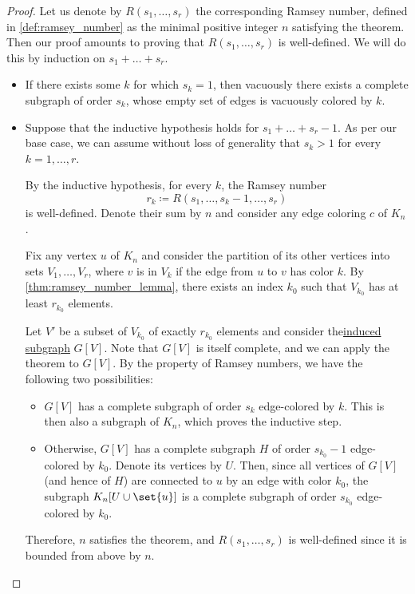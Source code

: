 \begin{proof}
  Let us denote by \( R(s_1, \ldots, s_r) \) the corresponding Ramsey number, defined in \cref{def:ramsey_number} as the minimal positive integer \( n \) satisfying the theorem. Then our proof amounts to proving that \( R(s_1, \ldots, s_r) \) is well-defined. We will do this by induction on \( s_1 + \ldots + s_r \).

  \begin{itemize}
    \item If there exists some \( k \) for which \( s_k = 1 \), then vacuously there exists a complete subgraph of order \( s_k \), whose empty set of edges is vacuously colored by \( k \).

    \item Suppose that the inductive hypothesis holds for \( s_1 + \ldots + s_r - 1 \). As per our base case, we can assume without loss of generality that \( s_k > 1 \) for every \( k = 1, \ldots, r \).

    By the inductive hypothesis, for every \( k \), the Ramsey number
    \begin{equation*}
      r_k \coloneqq R(s_1, \ldots, s_k - 1, \ldots, s_r)
    \end{equation*}
    is well-defined. Denote their sum by \( n \) and consider any edge coloring \( c \) of \( K_n \).

    Fix any vertex \( u \) of \( K_n \) and consider the partition of its other vertices into sets \( V_1, \ldots, V_r \), where \( v \) is in \( V_k \) if the edge from \( u \) to \( v \) has color \( k \). By \cref{thm:ramsey_number_lemma}, there exists an index \( k_0 \) such that \( V_{k_0} \) has at least \( r_{k_0} \) elements.

    Let \( V' \) be a subset of \( V_{k_0} \) of exactly \( r_{k_0} \) elements and consider the\hyperref[def:induced_subgraph]{induced subgraph} \( G[V] \). Note that \( G[V] \) is itself complete, and we can apply the theorem to \( G[V] \). By the property of Ramsey numbers, we have the following two possibilities:
    \begin{itemize}
      \item \( G[V] \) has a complete subgraph of order \( s_k \) edge-colored by \( k \). This is then also a subgraph of \( K_n \), which proves the inductive step.

      \item Otherwise, \( G[V] \) has a complete subgraph \( H \) of order \( s_{k_0} - 1 \) edge-colored by \( k_0 \). Denote its vertices by \( U \). Then, since all vertices of \( G[V] \) (and hence of \( H \)) are connected to \( u \) by an edge with color \( k_0 \), the subgraph \( K_n[U \cup \set{ u }] \) is a complete subgraph of order \( s_{k_0} \) edge-colored by \( k_0 \).
    \end{itemize}

    Therefore, \( n \) satisfies the theorem, and \( R(s_1, \ldots, s_r) \) is well-defined since it is bounded from above by \( n \).
  \end{itemize}
\end{proof}

